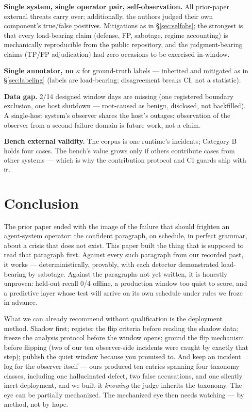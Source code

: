 \documentclass[11pt]{article}
\begin{document}
\textbf{Single system, single operator pair, self-observation.} All
prior-paper external threats carry over; additionally, the authors
judged their own component's true/false positives. Mitigations as in
\S\ref{sec:selfobs}; the strongest is that every load-bearing claim
(defense, FP, sabotage, regime accounting) is mechanically reproducible
from the public repository, and the judgment-bearing claims (TP/FP
adjudication) had zero occasions to be exercised in-window.

\textbf{Single annotator, no $\kappa$} for ground-truth labels ---
inherited and mitigated as in \S\ref{sec:labeling} (labels are
load-bearing; disagreement breaks CI, not a statistic).

\textbf{Data gap.} 2/14 designed window days are missing (one
registered boundary exclusion, one host shutdown --- root-caused as
benign, disclosed, not backfilled). A single-host system's observer
shares the host's outages; observation of the observer from a second
failure domain is future work, not a claim.

\textbf{Bench external validity.} The corpus is one runtime's
incidents; Category B holds four cases. The bench's value grows only if
others contribute cases from other systems --- which is why the
contribution protocol and CI guards ship with it.

\section{Conclusion}
\label{sec:conclusion}

The prior paper ended with the image of the failure that should
frighten an agent-system operator: the confident paragraph, on
schedule, in perfect grammar, about a crisis that does not exist. This
paper built the thing that is supposed to read that paragraph first.
Against every such paragraph from our recorded past, it works ---
deterministically, provably, with each detector demonstrated
load-bearing by sabotage. Against the paragraphs not yet written, it is
honestly unproven: held-out recall 0/4 offline, a production window too
quiet to score, and a predictive layer whose test will arrive on its
own schedule under rules we froze in advance.

What we can already recommend without qualification is the deployment
method. Shadow first; register the flip criteria before reading the
shadow data; freeze the analysis protocol before the window opens;
ground the flip mechanism before flipping (two of our ten
observer-side incidents were caught by exactly that step); publish the
quiet window because you promised to. And keep an incident log for the
observer itself --- ours produced ten entries spanning four taxonomy
classes, including one hallucinated defect, two false accusations, and
one silently inert deployment, and we built it \emph{knowing} the judge
inherits the taxonomy. The eye can be partially mechanized. The mechanized eye then
needs watching --- by method, not by hope.
\end{document}
